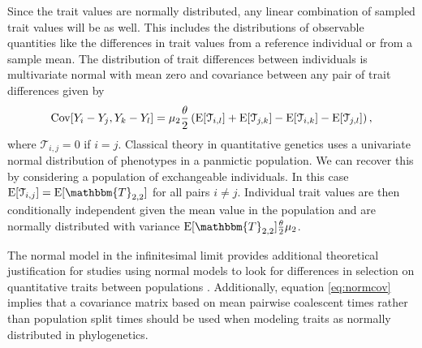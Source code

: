 Since the trait values are normally distributed, any linear combination of
sampled trait values will be as well. This includes the distributions of
observable quantities like the differences in trait values from a reference
individual or from a sample mean. The distribution of trait differences between
individuals is multivariate normal with mean zero and covariance between any
pair of trait differences given by
\begin{equation}
  \label{eq:normcov}
  \mathrm{Cov}[Y_i-Y_j,Y_k-Y_l] = \mu_  2\frac{\theta}{2}\left( \mathrm{E}[\mathcal{T}_{i,l}] + \mathrm{E}[\mathcal{T}_{j,k}] -
                         \mathrm{E}[\mathcal{T}_{i,k}] - \mathrm{E}[\mathcal{T}_{j,l}] \right),
\end{equation}
where $\mathcal{T}_{i,j} = 0$ if $i = j$. Classical theory in quantitative
genetics uses a univariate normal distribution of phenotypes in a panmictic
population. We can recover this by considering a population of exchangeable
individuals. In this case $\E[\mathcal{T}_{i,j}] = \E[\mathbbm{T}_{2,2}]$ for all pairs
$i \neq j$. Individual trait values are then conditionally independent given the
mean value in the population and are normally distributed with variance
$\E[\mathbbm{T}_{2,2}]\T\mu_2$.

The normal model in the infinitesimal limit provides additional theoretical
justification for studies using normal models to look for differences in
selection on quantitative traits between populations
\citep{Ovaskainen2011,Praebel2013,Robinson2015}. Additionally, equation
\eqref{eq:normcov} implies that a covariance matrix based on mean pairwise
coalescent times rather than population split times should be used when modeling
traits as normally distributed in phylogenetics.

 
